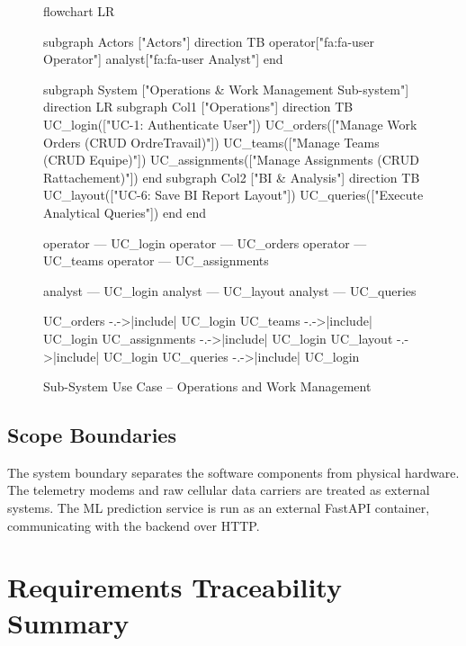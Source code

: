 \begin{figure}[H]
  \centering
  \begin{mermaid}[width=1.0\textwidth]
flowchart LR
    
    subgraph Actors ["Actors"]
        direction TB
        operator["fa:fa-user Operator"]
        analyst["fa:fa-user Analyst"]
    end
    
    subgraph System ["Operations & Work Management Sub-system"]
        direction LR
        subgraph Col1 ["Operations"]
            direction TB
            UC_login(["UC-1: Authenticate User"])
            UC_orders(["Manage Work Orders (CRUD OrdreTravail)"])
            UC_teams(["Manage Teams (CRUD Equipe)"])
            UC_assignments(["Manage Assignments (CRUD Rattachement)"])
        end
        subgraph Col2 ["BI & Analysis"]
            direction TB
            UC_layout(["UC-6: Save BI Report Layout"])
            UC_queries(["Execute Analytical Queries"])
        end
    end
    
    operator --- UC_login
    operator --- UC_orders
    operator --- UC_teams
    operator --- UC_assignments
    
    analyst --- UC_login
    analyst --- UC_layout
    analyst --- UC_queries
    
    UC_orders -.->|include| UC_login
    UC_teams -.->|include| UC_login
    UC_assignments -.->|include| UC_login
    UC_layout -.->|include| UC_login
    UC_queries -.->|include| UC_login
  \end{mermaid}
  \caption{Sub-System Use Case -- Operations and Work Management}
  \label{fig:usecase-ops}
\end{figure}

\subsection{Scope Boundaries}
The system boundary separates the software components from physical hardware. The telemetry modems and raw cellular data carriers are treated as external systems. The ML prediction service is run as an external FastAPI container, communicating with the backend over HTTP.

\section{Requirements Traceability Summary}

